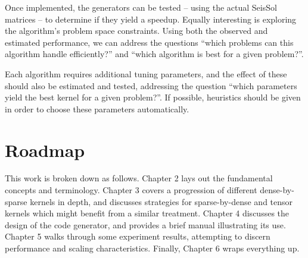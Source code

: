Once implemented, the generators can be tested -- using the actual SeisSol matrices -- to determine if they yield a speedup. Equally interesting is exploring the algorithm's problem space constraints. Using both the observed and estimated performance, we can address the questions ``which problems can this algorithm handle efficiently?'' and ``which algorithm is best for a given problem?''. 

Each algorithm requires additional tuning parameters, and the effect of these should also be estimated and tested, addressing the question ``which parameters yield the best kernel for a given problem?''. If possible, heuristics should be given in order to choose these parameters automatically.

   
\section{Roadmap} 
  This work is broken down as follows. Chapter 2 lays out the fundamental concepts and terminology. Chapter 3 covers a progression of different dense-by-sparse kernels in depth, and discusses strategies for sparse-by-dense and tensor kernels which might benefit from a similar treatment. Chapter 4 discusses the design of the code generator, and provides a brief manual illustrating its use. Chapter 5 walks through some experiment results, attempting to discern performance and scaling characteristics. Finally, Chapter 6 wraps everything up.










